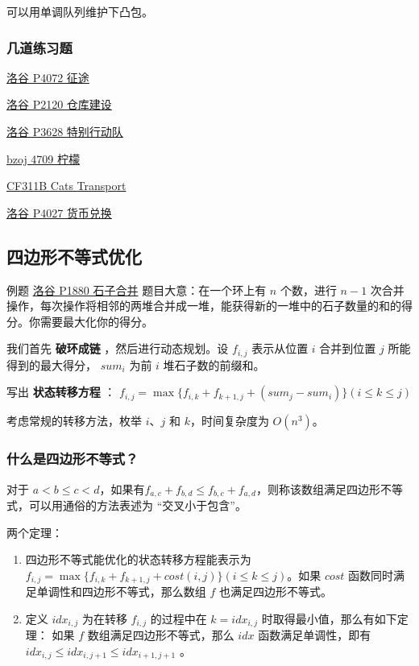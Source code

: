 可以用单调队列维护下凸包。

\subsubsection{几道练习题}

\href{https://www.luogu.org/problemnew/show/P4072}{洛谷 P4072 征途}

\href{https://www.luogu.org/problemnew/show/P2120}{洛谷 P2120 仓库建设}

\href{https://www.luogu.org/problemnew/show/P3628}{洛谷 P3628 特别行动队}

\href{https://www.lydsy.com/JudgeOnline/problem.php?id=4709}{bzoj 4709 柠檬}

\href{http://codeforces.com/problemset/problem/311/B}{CF311B Cats Transport}

\href{https://www.luogu.org/problemnew/show/P4027}{洛谷 P4027 货币兑换}

\subsection{四边形不等式优化}

\begin{NOTE}{例题 \href{https://www.luogu.org/problemnew/show/P1880}{洛谷 P1880 石子合并}}{}
题目大意：在一个环上有 $n$ 个数，进行 $n-1$ 次合并操作，每次操作将相邻的两堆合并成一堆，能获得新的一堆中的石子数量的和的得分。你需要最大化你的得分。

\end{NOTE}


我们首先 \textbf{ 破环成链 } ，然后进行动态规划。设 $f_{i,j}$ 表示从位置 $i$ 合并到位置 $j$ 所能得到的最大得分， $sum_i$ 为前 $i$ 堆石子数的前缀和。

写出 \textbf{ 状态转移方程 } ： $f_{i,j}=\max\{f_{i,k}+f_{k+1,j}+(sum_j-sum_i)\}(i\le k\le j)$

考虑常规的转移方法，枚举 $i$、$j$ 和 $k$，时间复杂度为 $O(n^3)$。

\subsubsection{什么是四边形不等式？}

对于 $a<b\le c<d$，如果有$f_{a,c}+f_{b,d}\le f_{b,c}+f_{a,d}$，则称该数组满足四边形不等式，可以用通俗的方法表述为 “交叉小于包含”。

两个定理：

\begin{enumerate}
\item 四边形不等式能优化的状态转移方程能表示为 $f_{i,j}=\max\{f_{i,k}+f_{k+1,j}+cost(i,j)\}(i\le k\le j)$。如果 $cost$ 函数同时满足单调性和四边形不等式，那么数组 $f$ 也满足四边形不等式。
\item 定义 $idx_{i,j}$ 为在转移 $f_{i,j}$ 的过程中在 $k=idx_{i,j}$ 时取得最小值，那么有如下定理：
如果 $f$ 数组满足四边形不等式，那么 $idx$ 函数满足单调性，即有 $idx_{i,j}\le idx_{i,j+1}\le idx_{i+1,j+1}$ 。
\end{enumerate}

